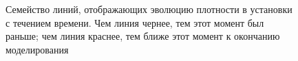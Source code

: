 \begin{figure}[H]
	\begin{minipage}[h]{0.99\linewidth}
	\end{minipage}
	\hfill
	\begin{minipage}[h]{0.99\linewidth}
	\end{minipage}
	\caption{Семейство линий, отображающих эволюцию плотности в установки с течением времени. Чем линия чернее, тем этот момент был раньше; чем линия краснее, тем ближе этот момент к окончанию моделирования}
	\label{fig:density_evolution}
\end{figure}

